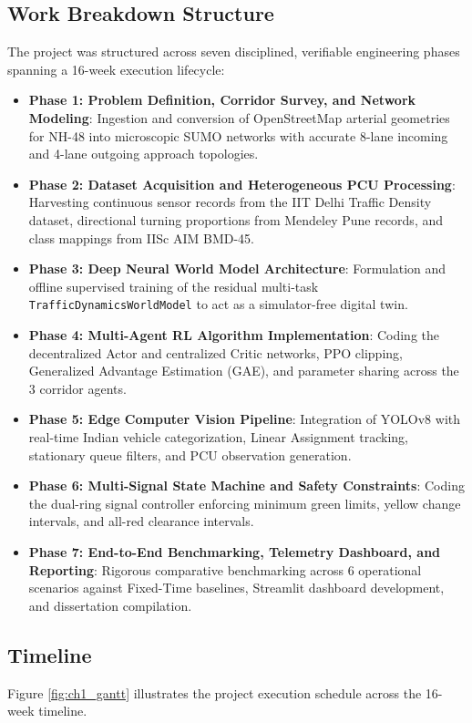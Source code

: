 \subsection{Work Breakdown Structure}
The project was structured across seven disciplined, verifiable engineering phases spanning a 16-week execution lifecycle:
\begin{itemize}
    \item \textbf{Phase 1: Problem Definition, Corridor Survey, and Network Modeling}: Ingestion and conversion of OpenStreetMap arterial geometries for NH-48 into microscopic SUMO networks with accurate 8-lane incoming and 4-lane outgoing approach topologies.
    \item \textbf{Phase 2: Dataset Acquisition and Heterogeneous PCU Processing}: Harvesting continuous sensor records from the IIT Delhi Traffic Density dataset, directional turning proportions from Mendeley Pune records, and class mappings from IISc AIM BMD-45.
    \item \textbf{Phase 3: Deep Neural World Model Architecture}: Formulation and offline supervised training of the residual multi-task \texttt{TrafficDynamicsWorldModel} to act as a simulator-free digital twin.
    \item \textbf{Phase 4: Multi-Agent RL Algorithm Implementation}: Coding the decentralized Actor and centralized Critic networks, PPO clipping, Generalized Advantage Estimation (GAE), and parameter sharing across the 3 corridor agents.
    \item \textbf{Phase 5: Edge Computer Vision Pipeline}: Integration of YOLOv8 with real-time Indian vehicle categorization, Linear Assignment tracking, stationary queue filters, and PCU observation generation.
    \item \textbf{Phase 6: Multi-Signal State Machine and Safety Constraints}: Coding the dual-ring signal controller enforcing minimum green limits, yellow change intervals, and all-red clearance intervals.
    \item \textbf{Phase 7: End-to-End Benchmarking, Telemetry Dashboard, and Reporting}: Rigorous comparative benchmarking across 6 operational scenarios against Fixed-Time baselines, Streamlit dashboard development, and dissertation compilation.
\end{itemize}

\subsection{Timeline}
Figure \ref{fig:ch1_gantt} illustrates the project execution schedule across the 16-week timeline.

